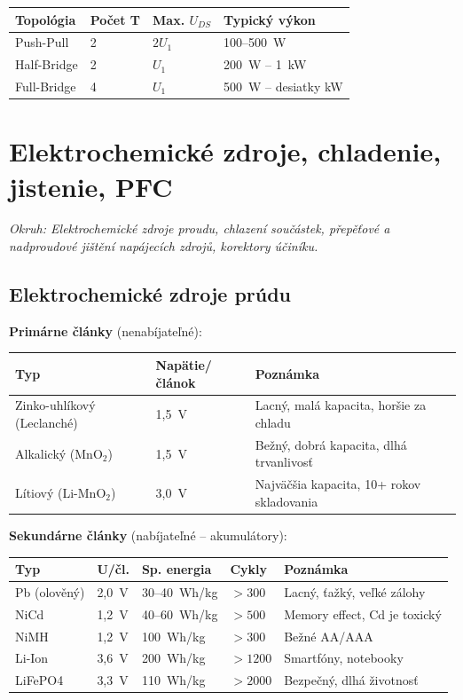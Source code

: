 \begin{center}
\begin{tabular}{llll}
\toprule
\textbf{Topológia} & \textbf{Počet T} & \textbf{Max. $U_{DS}$} & \textbf{Typický výkon} \\
\midrule
Push-Pull    & 2 & $2 U_1$ & 100--500~W \\
Half-Bridge  & 2 & $U_1$   & 200~W -- 1~kW \\
Full-Bridge  & 4 & $U_1$   & 500~W -- desiatky kW \\
\bottomrule
\end{tabular}
\end{center}

\chapter{Elektrochemické zdroje, chladenie, jistenie, PFC}

\textit{Okruh: Elektrochemické zdroje proudu, chlazení součástek, přepěťové a nadproudové jištění napájecích zdrojů, korektory účiníku.}

\section{Elektrochemické zdroje prúdu}

\textbf{Primárne články} (nenabíjateľné):

\begin{center}
\begin{tabular}{lll}
\toprule
\textbf{Typ} & \textbf{Napätie/článok} & \textbf{Poznámka} \\
\midrule
Zinko-uhlíkový (Leclanché) & 1,5~V & Lacný, malá kapacita, horšie za chladu \\
Alkalický (MnO$_2$) & 1,5~V & Bežný, dobrá kapacita, dlhá trvanlivosť \\
Lítiový (Li-MnO$_2$) & 3,0~V & Najväčšia kapacita, 10+ rokov skladovania \\
\bottomrule
\end{tabular}
\end{center}

\textbf{Sekundárne články} (nabíjateľné -- akumulátory):

\begin{center}
\begin{tabular}{lllll}
\toprule
\textbf{Typ} & \textbf{U/čl.} & \textbf{Sp. energia} & \textbf{Cykly} & \textbf{Poznámka} \\
\midrule
Pb (olověný) & 2,0~V & 30--40~Wh/kg & $>300$ & Lacný, ťažký, veľké zálohy \\
NiCd         & 1,2~V & 40--60~Wh/kg & $>500$ & Memory effect, Cd je toxický \\
NiMH         & 1,2~V & 100~Wh/kg    & $>300$ & Bežné AA/AAA \\
Li-Ion       & 3,6~V & 200~Wh/kg    & $>1200$ & Smartfóny, notebooky \\
LiFePO4      & 3,3~V & 110~Wh/kg    & $>2000$ & Bezpečný, dlhá životnosť \\
\bottomrule
\end{tabular}
\end{center}

